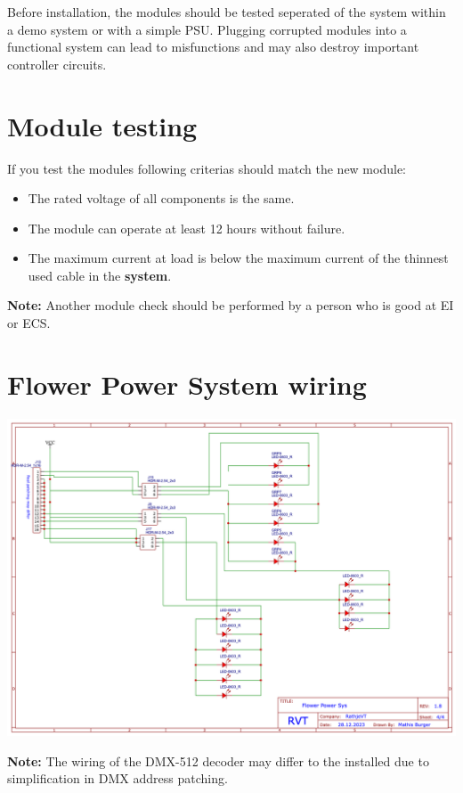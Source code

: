 \documentclass[10pt]{datasheet}
\begin{document}
Before installation, the modules should be tested seperated of the system within a demo system or with a simple PSU.
Plugging corrupted modules into a functional system can lead to misfunctions and may also destroy important controller circuits.

\section{Module testing}

If you test the modules following criterias should match the new module:
\begin{itemize}
\item{The rated voltage of all components is the same.}
\item{The module can operate at least 12 hours without failure.}
\item{The maximum current at load is below the maximum current of the thinnest used cable in the \textbf{system}.}
\end{itemize}

\textbf{Note:} Another module check should be performed by a person who is good at EI or ECS.


\pagebreak

\section{Flower Power System wiring}

\includegraphics[scale=0.4]{Flower Power System.png}

\textbf{Note:} The wiring of the DMX-512 decoder may differ to the installed due to simplification in DMX address patching.
\end{document}

